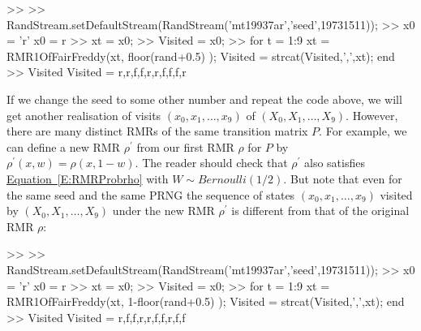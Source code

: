 \begin{example}
\begin{VrbM}
>> %
>> RandStream.setDefaultStream(RandStream('mt19937ar','seed',19731511));
>> x0 = 'r' %
x0 = r
>> xt = x0; %
>> Visited = x0; %
>> for t = 1:9 %
xt = RMR1OfFairFreddy(xt, floor(rand+0.5) ); %
Visited = strcat(Visited,',',xt); %
end
>> Visited %
Visited = r,r,f,f,r,r,f,f,f,r
\end{VrbM}
If we change the seed to some other number and repeat the code above, we will get another realisation of visits $(x_0,x_1,\ldots,x_9)$ of $(X_0,X_1,\ldots,X_9)$.  However, there are many distinct RMRs of the same transition matrix $P$.  For example, we can define a new RMR $\rho^\prime$ from our first RMR $\rho$ for $P$ by $\rho^\prime(x,w)=\rho(x,1-w)$.  The reader should check that $\rho^\prime$ also satisfies \hyperref[E:RMRProbrho]{Equation~\ref*{E:RMRProbrho}} with $W \sim Bernoulli(1/2)$. But note that even for the same seed and the same PRNG the sequence of states $(x_0,x_1,\ldots,x_9)$ visited by $(X_0,X_1,\ldots,X_9)$ under the new RMR $\rho^\prime$ is different from that of the original RMR $\rho$:
\begin{VrbM}
>> %
>> RandStream.setDefaultStream(RandStream('mt19937ar','seed',19731511));
>> x0 = 'r' %
x0 = r
>> xt = x0; %
>> Visited = x0; %
>> for t = 1:9 %
xt = RMR1OfFairFreddy(xt, 1-floor(rand+0.5) ); %
Visited = strcat(Visited,',',xt); %
end
>> Visited %
Visited = r,f,f,r,r,f,f,r,f,f
\end{VrbM}	
\end{example}

